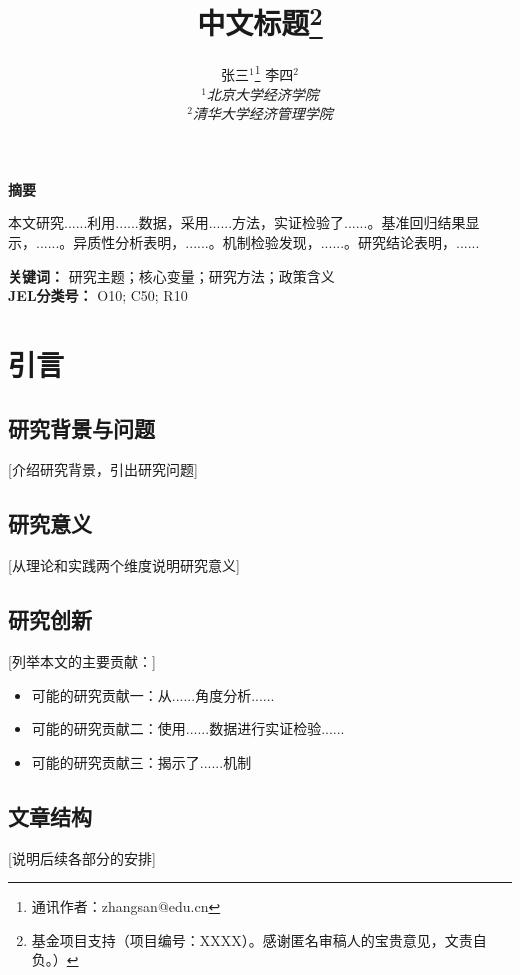 \documentclass[UTF8, a4paper, 12pt]{ctexart}
\title{\textbf{中文标题}\thanks{基金项目支持（项目编号：XXXX）。感谢匿名审稿人的宝贵意见，文责自负。）}}
\author{
张三$^{1}$\footnote{通讯作者：zhangsan@edu.cn} \quad 李四$^{2}$ \\
$^{1}$\textit{北京大学经济学院} \\
$^{2}$\textit{清华大学经济管理学院}
}
\date{}
\numberwithin{equation}{section}
\begin{document}
\maketitle
\thispagestyle{empty}

\begin{center}
\textbf{摘\quad 要}
\end{center}
\vspace{1ex}

本文研究......利用......数据，采用......方法，实证检验了......。基准回归结果显示，......。异质性分析表明，......。机制检验发现，......。研究结论表明，......

\medskip
\noindent
\textbf{关键词：} 研究主题；核心变量；研究方法；政策含义 \\
\textbf{JEL分类号：} O10; C50; R10

\newpage

\section{引言}

\subsection{研究背景与问题}
[介绍研究背景，引出研究问题]

\subsection{研究意义}
[从理论和实践两个维度说明研究意义]

\subsection{研究创新}
[列举本文的主要贡献：]
\begin{itemize}
    \item 可能的研究贡献一：从......角度分析......
    \item 可能的研究贡献二：使用......数据进行实证检验......
    \item 可能的研究贡献三：揭示了......机制
\end{itemize}

\subsection{文章结构}
[说明后续各部分的安排]
\end{document}
